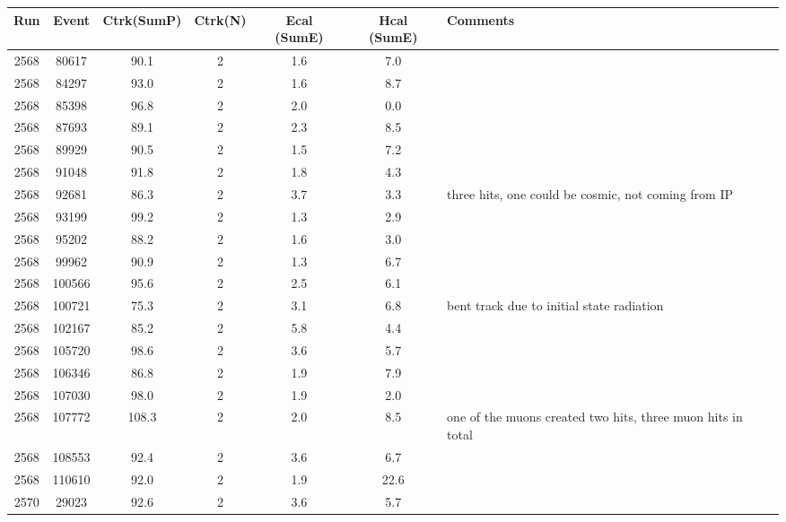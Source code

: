\begin{tabular}{ccccccl}
	\toprule
	Run & Event & Ctrk(SumP) & Ctrk(N) & Ecal (SumE) & Hcal (SumE) & Comments \\
	\midrule
	2568 & 80617  & 90.1  & 2 & 1.6 & 7.0  &  \\ \midrule
	2568 & 84297  & 93.0  & 2 & 1.6 & 8.7  &  \\
	2568 & 85398  & 96.8  & 2 & 2.0 & 0.0  &  \\
	2568 & 87693  & 89.1  & 2 & 2.3 & 8.5  &  \\
	2568 & 89929  & 90.5  & 2 & 1.5 & 7.2  &  \\
	2568 & 91048  & 91.8  & 2 & 1.8 & 4.3  &  \\
	2568 & 92681  & 86.3  & 2 & 3.7 & 3.3  &  three hits, one could be cosmic, not coming from IP\\
	2568 & 93199  & 99.2  & 2 & 1.3 & 2.9  &  \\
	2568 & 95202  & 88.2  & 2 & 1.6 & 3.0  &  \\
	2568 & 99962  & 90.9  & 2 & 1.3 & 6.7  &  \\
	2568 & 100566 & 95.6  & 2 & 2.5 & 6.1  &  \\
	2568 & 100721 & 75.3  & 2 & 3.1 & 6.8  &  bent track due to initial state radiation \\
	2568 & 102167 & 85.2  & 2 & 5.8 & 4.4  &  \\
	2568 & 105720 & 98.6  & 2 & 3.6 & 5.7  &  \\
	2568 & 106346 & 86.8  & 2 & 1.9 & 7.9  &  \\
	2568 & 107030 & 98.0  & 2 & 1.9 & 2.0  &  \\
	2568 & 107772 & 108.3 & 2 & 2.0 & 8.5  &  one of the muons created two hits, three muon hits in total\\
	2568 & 108553 & 92.4  & 2 & 3.6 & 6.7  &  \\
	2568 & 110610 & 92.0  & 2 & 1.9 & 22.6 & \korr{Warum soviel Hcal? Kann man das erklären?} \\
	2570 & 29023  & 92.6  & 2 & 3.6 & 5.7  &  \\
	\bottomrule
\end{tabular}
